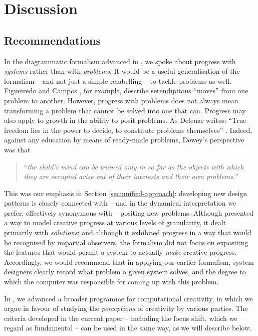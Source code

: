 
\section{Discussion} \label{sec:discussion}

\subsection{Recommendations} \label{sec:recommendations}

In the diagrammatic formalism advanced in
\cite{colton-assessingprogress}, we spoke about progress with
\emph{systems} rather than with \emph{problems}.  It would be a useful
generalisation of the formalism -- and not just a simple relabelling
-- to tackle problems as well.
%
Figueiredo and Campos \cite{Figueiredo2001}, for example, describe
serendipitous ``moves'' from one problem to another.
%
However, progress with problems does not always mean transforming a
problem that cannot be solved into one that can.  Progress may also
apply to growth in the ability to posit problems.  As Deleuze writes:
``True freedom lies in the power to decide, to constitute problems
themselves'' \cite[p. 15]{deleuze1991bergsonism}.  Indeed, against any
education by means of ready-made problems, Dewey's perspective was
that
\begin{quote}
``\emph{the child's mind can be trained only in so far as the objects
    with which they are occupied arise out of their interests and
    their own problems.}''~\cite{dewey-by-mead}
\end{quote}

This was our emphasis in Section \ref{sec:unified-approach}:
developing new design patterns is closely connected with -- and in the
dynamical interpretation we prefer, effectively synonymous with --
positing new problems.  Although \cite{colton-assessingprogress}
presented a way to model creative progress at various levels of
granularity, it dealt primarily with \emph{solutions}; and although it
exhibited progress in a way that would be recognised by impartial
observers, the formalism did not focus on expositing the features that
would permit a system to actually \emph{make} creative progress.
Accordingly, we would recommend that in applying our earlier
formalism, system designers clearly record what problem a given system
solves, and the degree to which the computer was responsible for
coming up with this problem.

In \cite{stakeholder-groups-bookchapter}, we advanced a broader
programme for computational creativity, in which we argue in favour of
studying the \emph{perceptions} of creativity by various parties.  The
criteria developed in the current paper -- including the focus shift,
which we regard as fundamental -- can be used in the same way, as we
will describe below.

